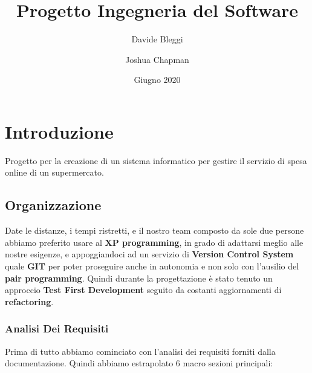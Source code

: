 \documentclass[12pt, a4paper]{report}
\title{Progetto Ingegneria del Software}
\author{Davide Bleggi \and Joshua Chapman}
\date{Giugno 2020}
\begin{document}
\begin{titlepage}
  \maketitle
\end{titlepage}

\tableofcontents
\newpage


\chapter{Introduzione}

Progetto per la creazione di un sistema informatico per gestire il servizio di
spesa online di un supermercato.

\section{Organizzazione}
Date le distanze, i tempi ristretti, e il nostro team composto da sole due
persone abbiamo preferito usare al \textbf{XP programming}, in grado di
adattarsi meglio alle nostre esigenze, e appoggiandoci ad un servizio di
\textbf{Version Control System} quale \textbf{GIT} per poter proseguire anche
in autonomia e non solo con l'ausilio del \textbf{pair programming}. Quindi
durante la progettazione è stato tenuto un approccio \textbf{Test First
Development} seguito da costanti aggiornamenti di \textbf{refactoring}.

\subsection{Analisi Dei Requisiti}
Prima di tutto abbiamo cominciato con l'analisi dei requisiti forniti dalla
documentazione. Quindi abbiamo estrapolato 6 macro sezioni principali:
\end{document}
